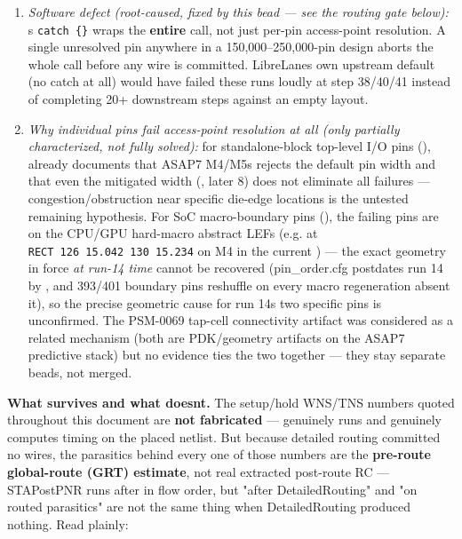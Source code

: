 \begin{record}
\begin{enumerate}
\def\labelenumi{\arabic{enumi}.}
\tightlist
\item
  \emph{Software defect (root-caused, fixed by this bead --- see the
  routing gate below):} \textquotesingle s
  \texttt{catch\ \{\}} wraps the \textbf{entire} 
  call, not just per-pin access-point resolution. A single unresolved
  pin anywhere in a 150,000--250,000-pin design aborts the whole call
  before any wire is committed. LibreLane\textquotesingle s own upstream
  default (no catch at all) would have failed these runs loudly at step
  38/40/41 instead of completing 20+ downstream steps against an empty
  layout.
\item
  \emph{Why individual pins fail access-point resolution at all (only
  partially characterized, not fully solved):} for standalone-block
  top-level I/O pins (), 
  already documents that ASAP7 M4/M5\textquotesingle s 
  rejects the default pin width and that even the mitigated width
  (, later 8) does not eliminate all
  failures --- congestion/\allowbreak{}obstruction near specific
  die-edge locations is the untested remaining hypothesis. For SoC
  macro-boundary pins (), the failing pins are on the
  CPU/GPU hard-macro abstract LEFs (e.g.  at
  \texttt{RECT\ 126\ 15.\allowbreak{}042\ 130\ 15.\allowbreak{}234} on
  M4 in the current ) --- the exact geometry in
  force \emph{at run-14 time} cannot be recovered
  (pin\_\allowbreak{}order.cfg postdates run 14 by , and 393/401
  boundary pins reshuffle on every macro regeneration absent it), so the
  precise geometric cause for run 14\textquotesingle s two specific pins
  is unconfirmed. The  PSM-0069 tap-cell connectivity artifact
  was considered as a related mechanism (both are
  PDK/\allowbreak{}geometry artifacts on the ASAP7 predictive stack) but
  no evidence ties the two together --- they stay separate beads, not
  merged.
\end{enumerate}

\textbf{What survives and what doesn\textquotesingle t.} The
setup/\allowbreak{}hold WNS/TNS numbers quoted throughout this document
are \textbf{not fabricated} ---  genuinely
runs and genuinely computes timing on the placed netlist. But because
detailed routing committed no wires, the parasitics behind every one of
those numbers are the \textbf{pre-route global-route (GRT) estimate},
not real extracted post-route RC --- STAPostPNR runs after
 in flow order, but "after DetailedRouting" and
"on routed parasitics" are not the same thing when DetailedRouting
produced nothing. Read plainly:


\end{record}
